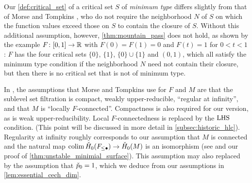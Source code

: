\begin{rem}\label{rem:critical_set}
	Our \cref{def:critical_set} of a critical set $S$ of \emph{minimum type} differs slightly from that of Morse and Tompkins \cite[p.~466]{Morse.1939}, who do not require the neighborhood $N$ of $S$ on which the function values exceed those on $S$ to contain the closure of $S$.
	Without this additional assumption, however, \cref{thm:mountain_pass} does not hold, as shown by the example $F \colon [0,1] \to \mathbb{R}$ with $F(0) = F(1) = 0$ and $F(t) = 1$ for $0 < t < 1$:
	$F$ has the four critical sets $\{0\}$, $\{1\}$, $\{0\} \cup \{1\}$ and $(0,1)$, which all satisfy the minimum type condition if the neighborhood $N$ need not contain their closure, but then there is no critical set that is not of minimum type.
\end{rem}

\begin{rem}\label{rem:mountain_pass_assumptions}
	In \cite[Corollary 7.1]{Morse.1939}, the assumptions that Morse and Tompkins use for $F$ and $M$ are that the sublevel set filtration is compact,  weakly upper-reducible, ``regular at infinity'', and that $M$ is ``locally $F$-connected''.
	Compactness is also required for our version, as is weak upper-reducibility.
	Local $F$-connectedness is replaced by the $\mathrm{LHS}$ condition.
	(This point will be discussed in more detail in \cref{subsec:historic_hlc}).
	Regularity at infinity roughly corresponds to our assumption that $M$ is connected and the natural map $\operatorname*{colim} \check{H}_0(F_{\leq \bullet}) \to \check{H}_0(M)$ is an isomorphism (see \cite[p.~444]{Morse.1939} and our proof of \cref{thm:unstable_minimial_surface}).
	This assumption may also replaced by the assumption that $\check{p}_0 = 1$, which we deduce from our assumptions in \cref{lem:essential_cech_dim}.
\end{rem}

